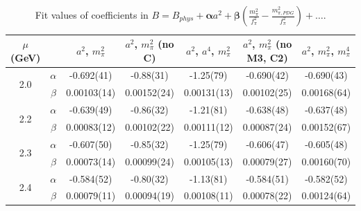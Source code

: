 \documentclass[12pt]{extarticle}
\begin{document}
\begin{table}[h!]
\begin{center}
\begin{tabular}{|c c|c|c|c|c|c|}
\hline
$\mu$ (GeV) &  & $a^2$, $m_\pi^2$& $a^2$, $m_\pi^2$ (no C)& $a^2$, $a^4$, $m_\pi^2$& $a^2$, $m_\pi^2$ (no M3, C2)& $a^2$, $m_\pi^2$, $m_\pi^4$\\
\hline
\multirow{2}{0.5in}{2.0} & $\alpha$ & -0.692(41)& -0.88(31)& -1.25(79)& -0.690(42)& -0.690(43)\\
 & $\beta$ & 0.00103(14)& 0.00152(24)& 0.00131(13)& 0.00102(25)& 0.00168(64)\\
\hline
\multirow{2}{0.5in}{2.2} & $\alpha$ & -0.639(49)& -0.86(32)& -1.21(81)& -0.638(48)& -0.637(48)\\
 & $\beta$ & 0.00083(12)& 0.00102(22)& 0.00111(12)& 0.00087(24)& 0.00152(67)\\
\hline
\multirow{2}{0.5in}{2.3} & $\alpha$ & -0.607(50)& -0.85(32)& -1.25(79)& -0.606(47)& -0.605(48)\\
 & $\beta$ & 0.00073(14)& 0.00099(24)& 0.00105(13)& 0.00079(27)& 0.00160(70)\\
\hline
\multirow{2}{0.5in}{2.4} & $\alpha$ & -0.584(52)& -0.80(32)& -1.13(81)& -0.584(51)& -0.582(52)\\
 & $\beta$ & 0.00079(11)& 0.00094(19)& 0.00108(11)& 0.00078(22)& 0.00124(64)\\
\hline
\end{tabular}
\caption{Fit values of coefficients in $B = B_{phys} + \mathbf{\alpha} a^2 + \mathbf{\beta}\left(\frac{m_\pi^2}{f_\pi^2}-\frac{m_{\pi,PDG}^2}{f_\pi^2}\right) + \ldots$.}
\end{center}
\end{table}




















\clearpage
\end{document}
